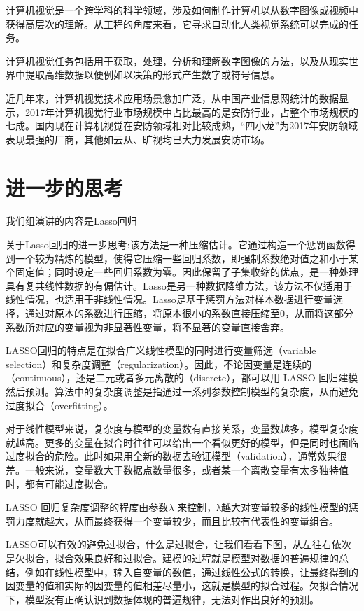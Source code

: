 \documentclass{article}
\begin{document}
计算机视觉是一个跨学科的科学领域，涉及如何制作计算机以从数字图像或视频中获得高层次的理解。从工程的角度来看，它寻求自动化人类视觉系统可以完成的任务。

计算机视觉任务包括用于获取，处理，分析和理解数字图像的方法，以及从现实世界中提取高维数据以便例如以决策的形式产生数字或符号信息。

近几年来，计算机视觉技术应用场景愈加广泛，从中国产业信息网统计的数据显示，2017年计算机视觉行业市场规模中占比最高的是安防行业，占整个市场规模的七成。国内现在计算机视觉在安防领域相对比较成熟，“四小龙”为2017年安防领域表现最强的厂商，其他如云从、旷视均已大力发展安防市场。

\section{进一步的思考}
我们组演讲的内容是Lasso回归\par

关于Lasso回归的进一步思考:该方法是一种压缩估计。它通过构造一个惩罚函数得到一个较为精炼的模型，使得它压缩一些回归系数，即强制系数绝对值之和小于某个固定值；同时设定一些回归系数为零。因此保留了子集收缩的优点，是一种处理具有复共线性数据的有偏估计。Lasso是另一种数据降维方法，该方法不仅适用于线性情况，也适用于非线性情况。Lasso是基于惩罚方法对样本数据进行变量选择，通过对原本的系数进行压缩，将原本很小的系数直接压缩至0，从而将这部分系数所对应的变量视为非显著性变量，将不显著的变量直接舍弃。

LASSO回归的特点是在拟合广义线性模型的同时进行变量筛选（variable selection）和复杂度调整（regularization）。因此，不论因变量是连续的（continuous），还是二元或者多元离散的（discrete），都可以用 LASSO 回归建模然后预测。算法中的复杂度调整是指通过一系列参数控制模型的复杂度，从而避免过度拟合（overfitting）。

对于线性模型来说，复杂度与模型的变量数有直接关系，变量数越多，模型复杂度就越高。更多的变量在拟合时往往可以给出一个看似更好的模型，但是同时也面临过度拟合的危险。此时如果用全新的数据去验证模型（validation），通常效果很差。一般来说，变量数大于数据点数量很多，或者某一个离散变量有太多独特值时，都有可能过度拟合。

LASSO 回归复杂度调整的程度由参数$\lambda$ 来控制，λ越大对变量较多的线性模型的惩罚力度就越大，从而最终获得一个变量较少，而且比较有代表性的变量组合。

LASSO可以有效的避免过拟合，什么是过拟合，让我们看看下图，从左往右依次是欠拟合，拟合效果良好和过拟合。建模的过程就是模型对数据的普遍规律的总结，例如在线性模型中，输入自变量的数值，通过线性公式的转换，让最终得到的因变量的值和实际的因变量的值相差尽量小，这就是模型的拟合过程。欠拟合情况下，模型没有正确认识到数据体现的普遍规律，无法对作出良好的预测。
\end{document}
